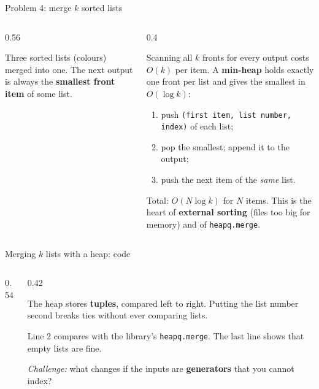 \documentclass[aspectratio=169,10pt]{beamer}
\begin{document}
\begin{frame}{Problem 4: merge $k$ sorted lists}
\begin{columns}[T]
\begin{column}{0.56\textwidth}
\begin{sfig}[0.6]
\begin{tikzpicture}
  
\end{tikzpicture}
\end{sfig}
\vspace{1mm}
{\small Three sorted lists (colours) merged into one. The next output is always the \textbf{smallest front item} of some list.}
\end{column}
\begin{column}{0.4\textwidth}
{\small
Scanning all $k$ fronts for every output costs $O(k)$ per item. A \textbf{min-heap} holds exactly one front per list and gives the smallest in $O(\log k)$:

\vspace{2mm}
\begin{enumerate}\setlength\itemsep{2pt}
\item push \texttt{(first item, list number, index)} of each list;
\item pop the smallest; append it to the output;
\item push the next item of the \emph{same} list.
\end{enumerate}
\vspace{1mm}
Total: $O(N\log k)$ for $N$ items. This is the heart of \textbf{external sorting} (files too big for memory) and of \texttt{heapq.merge}.}
\end{column}
\end{columns}
\end{frame}

\begin{frame}{Merging $k$ lists with a heap: code}
\begin{columns}[T]
\begin{column}{0.54\textwidth}
\end{column}
\begin{column}{0.42\textwidth}
\vspace{2mm}
{\small
The heap stores \textbf{tuples}, compared left to right. Putting the list number second breaks ties without ever comparing lists.

\vspace{2mm}
Line 2 compares with the library's \texttt{heapq.merge}. The last line shows that empty lists are fine.

\vspace{2mm}
\emph{Challenge:} what changes if the inputs are \textbf{generators} that you cannot index?}
\end{column}
\end{columns}
\end{frame}
\end{document}
